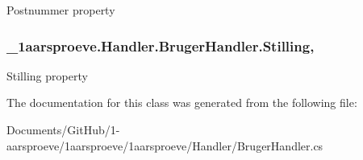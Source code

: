 Postnummer property 

\hypertarget{class__1aarsproeve_1_1_handler_1_1_bruger_handler_a46805384d3593dfcd0fdbd0bd9c24257}{}
\subsubsection[{Stilling}]{ \+\_\+1aarsproeve.\+Handler.\+Bruger\+Handler.\+Stilling\hspace{0.3cm}{\ttfamily [get]}, {\ttfamily [set]}}\label{class__1aarsproeve_1_1_handler_1_1_bruger_handler_a46805384d3593dfcd0fdbd0bd9c24257}


Stilling property 



The documentation for this class was generated from the following file\+:\begin{DoxyCompactItemize}
\item 
Documents/\+Git\+Hub/1-\/aarsproeve/1aarsproeve/1aarsproeve/\+Handler/Bruger\+Handler.\+cs\end{DoxyCompactItemize}
